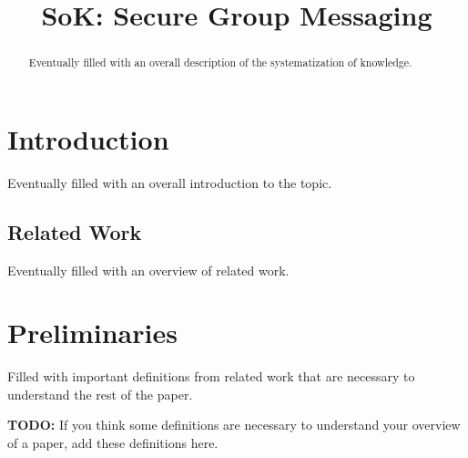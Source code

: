 \documentclass[a4paper,orivec]{llncs}
\title{SoK: Secure Group Messaging}
\author{}
\institute{}
\newcommand{\alert}[1]{{\color{red}#1}}
\begin{document}
    
\maketitle
\begin{abstract}
\alert{Eventually filled with an overall description of the systematization of knowledge.}
\end{abstract}

\section{Introduction}
\alert{Eventually filled with an overall introduction to the topic.}

\subsection{Related Work}
\alert{Eventually filled with an overview of related work.}

\section{Preliminaries}
\alert{Filled with important definitions from related work that are necessary to understand the rest of the paper.}

\alert{\textbf{TODO:} If you think some definitions are necessary to understand your overview of a paper, add these definitions here.}



























\end{document}
